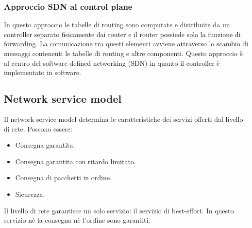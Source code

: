 \subsubsection{Approccio SDN al control plane}
In questo approccio le tabelle di routing sono computate e distribuite da un controller separato fisicamente dai router e il router possiede solo la 
funzione di forwarding. La comunicazione tra questi elementi avviene attraverso lo scambio di messaggi contenenti le tabelle di routing e altre componenti. 
Questo approccio \`e al centro del software-defined networking (SDN) in quanto il controller \`e implementato in software. 
\subsection{Network service model}
Il network service model determina le caratteristiche dei servizi offerti dal livello di rete. Possono essere:
\begin{multicols}{2}
\begin{itemize}
\item Consegna garantita.
\item Consegna garantita con ritardo limitato.
\item Consegna di pacchetti in ordine.
\item Sicurezza.
\end{itemize}
\end{multicols}
Il livello di rete garantisce un solo servizio: il servizio di best-effort. In questo servizio n\`e la consegna n\`e l'ordine sono garantiti.
